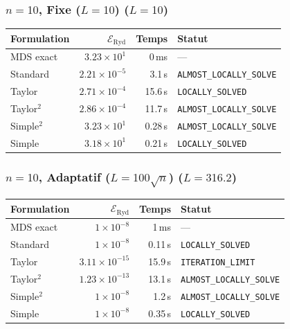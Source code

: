 \subsubsection{$n=10$, Fixe ($L{=}10$) ($L=10$)}
\begin{longtable}{@{}lrrl@{}}
  \toprule
  Formulation & $\mathcal{E}_{\mathrm{Ryd}}$ & Temps & Statut \\
  \midrule
  \endhead
  MDS exact & $3.23\times10^{1}$ & 0\,ms & --- \\
  Standard & $2.21\times10^{-5}$ & 3.1\,s & \texttt{ALMOST\_LOCALLY\_SOLVE} \\
  Taylor & $2.71\times10^{-4}$ & 15.6\,s & \texttt{LOCALLY\_SOLVED} \\
  Taylor$^2$ & $2.86\times10^{-4}$ & 11.7\,s & \texttt{ALMOST\_LOCALLY\_SOLVE} \\
  Simple$^2$ & $3.23\times10^{1}$ & 0.28\,s & \texttt{ALMOST\_LOCALLY\_SOLVE} \\
  Simple & $3.18\times10^{1}$ & 0.21\,s & \texttt{LOCALLY\_SOLVED} \\
  \bottomrule
\end{longtable}

\subsubsection{$n=10$, Adaptatif ($L{=}100\sqrt{n}$) ($L=316.2$)}
\begin{longtable}{@{}lrrl@{}}
  \toprule
  Formulation & $\mathcal{E}_{\mathrm{Ryd}}$ & Temps & Statut \\
  \midrule
  \endhead
  MDS exact & $1\times10^{-8}$ & 1\,ms & --- \\
  Standard & $1\times10^{-8}$ & 0.11\,s & \texttt{LOCALLY\_SOLVED} \\
  Taylor & $3.11\times10^{-15}$ & 15.9\,s & \texttt{ITERATION\_LIMIT} \\
  Taylor$^2$ & $1.23\times10^{-13}$ & 13.1\,s & \texttt{ALMOST\_LOCALLY\_SOLVE} \\
  Simple$^2$ & $1\times10^{-8}$ & 1.2\,s & \texttt{ALMOST\_LOCALLY\_SOLVE} \\
  Simple & $1\times10^{-8}$ & 0.35\,s & \texttt{LOCALLY\_SOLVED} \\
  \bottomrule
\end{longtable}

